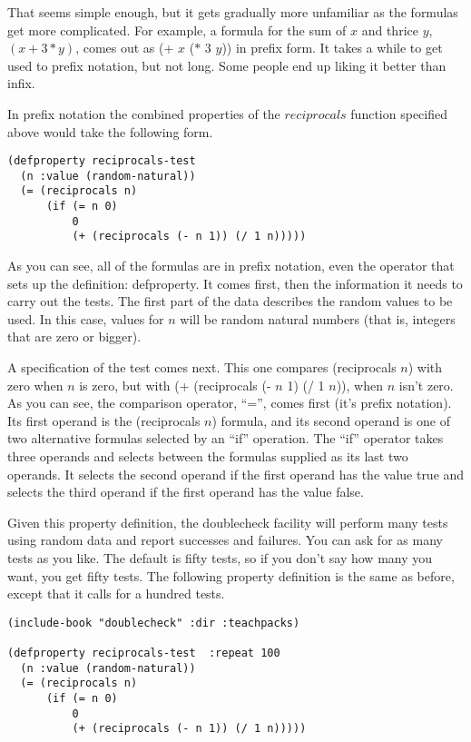 That seems simple enough, but it gets gradually more unfamiliar as the formulas get more complicated.
For example, a formula for the sum of $x$ and thrice $y$, $(x + 3*y)$,
comes out as (+ $x$ ($*$ $3$ $y$)) in prefix form.
It takes a while to get used to prefix notation, but not long.
Some people end up liking it better than infix.

In prefix notation the combined properties of the $reciprocals$ function
specified above would take the following form.

\begin{lstlisting}
(defproperty reciprocals-test
  (n :value (random-natural))
  (= (reciprocals n)
      (if (= n 0)
          0
          (+ (reciprocals (- n 1)) (/ 1 n)))))
\end{lstlisting}

As you can see, all of the formulas are in prefix notation, 
even the operator that sets up the definition: defproperty. 
It comes first, then  the information it needs to carry out the tests. 
The first part of the data describes the random values to be used. 
In this case, values for $n$ will be random natural numbers 
(that is, integers that are zero or bigger).

A specification of the test comes next. 
This one compares (reciprocals $n$) with zero when $n$ is zero, 
but with (+ (reciprocals (- $n$ 1) (/ 1 $n$)), when $n$ isn't zero.
As you can see, the comparison operator, ``='', comes first (it's prefix notation). 
Its first operand is the (reciprocals $n$) formula, 
and its second operand is one of two alternative formulas selected by an ``if'' operation. 
The ``if'' operator takes three operands and selects between the formulas supplied as its last two operands. 
It selects the second operand if the first operand has the value true 
and selects the third operand if the first operand has the value false.

Given this property definition, the doublecheck facility will perform many tests using random data and report successes and failures. You can ask for as many tests as you like. The default is fifty tests, so if you don't say how many you want, you get fifty tests. The following property definition is the same as before, except that it calls for a hundred tests.

\begin{lstlisting}
(include-book "doublecheck" :dir :teachpacks)

(defproperty reciprocals-test  :repeat 100
  (n :value (random-natural))
  (= (reciprocals n)
      (if (= n 0)
          0
          (+ (reciprocals (- n 1)) (/ 1 n)))))
\end{lstlisting}

